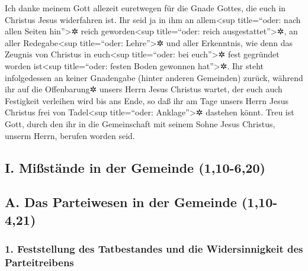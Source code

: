  Ich danke meinem Gott allezeit euretwegen für die Gnade
Gottes, die euch in Christus Jesus widerfahren ist.  Ihr
seid ja in ihm an allem\textless sup title=``oder: nach allen Seiten
hin''\textgreater✲ reich geworden\textless sup title=``oder: reich
ausgestattet''\textgreater✲, an aller Redegabe\textless sup
title=``oder: Lehre''\textgreater✲ und aller Erkenntnis, 
wie denn das Zeugnis von Christus in euch\textless sup title=``oder: bei
euch''\textgreater✲ fest gegründet worden ist\textless sup title=``oder:
festen Boden gewonnen hat''\textgreater✲.  Ihr steht
infolgedessen an keiner Gnadengabe (hinter anderen Gemeinden) zurück,
während ihr auf die Offenbarung✲ unsers Herrn Jesus Christus wartet,
 der euch auch Festigkeit verleihen wird bis ans Ende, so
daß ihr am Tage unsers Herrn Jesus Christus frei von Tadel\textless sup
title=``oder: Anklage''\textgreater✲ dastehen könnt.  Treu
ist Gott, durch den ihr in die Gemeinschaft mit seinem Sohne Jesus
Christus, unserm Herrn, berufen worden seid.

\hypertarget{i.-miuxdfstuxe4nde-in-der-gemeinde-110-620}{%
\subsection{I. Mißstände in der Gemeinde
(1,10-6,20)}\label{i.-miuxdfstuxe4nde-in-der-gemeinde-110-620}}

\hypertarget{a.-das-parteiwesen-in-der-gemeinde-110-421}{%
\subsection{A. Das Parteiwesen in der Gemeinde
(1,10-4,21)}\label{a.-das-parteiwesen-in-der-gemeinde-110-421}}

\hypertarget{feststellung-des-tatbestandes-und-die-widersinnigkeit-des-parteitreibens}{%
\subsubsection{1. Feststellung des Tatbestandes und die Widersinnigkeit
des
Parteitreibens}\label{feststellung-des-tatbestandes-und-die-widersinnigkeit-des-parteitreibens}}

